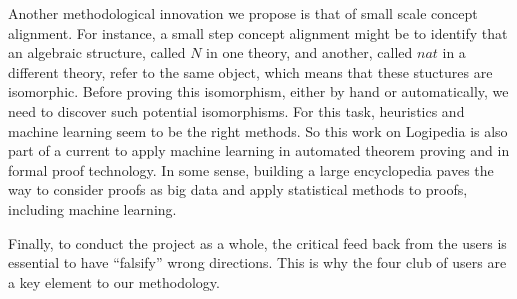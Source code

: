 Another methodological innovation we propose is that of small scale
concept alignment. For instance, a small step concept alignment might
be to identify that an algebraic structure, called $N$ in one theory,
and another, called $nat$ in a different theory, refer to the same
object, which means that these stuctures are isomorphic. Before
proving this isomorphism, either by hand or automatically, we need to
discover such potential isomorphisms. For this task, heuristics and
machine learning seem to be the right methods. So this work on
Logipedia is also part of a current to apply machine learning in
automated theorem proving and in formal proof technology. In some
sense, building a large encyclopedia paves the way to consider proofs
as big data and apply statistical methods to proofs, including machine
learning.

Finally, to conduct the project as a whole, the critical feed back
from the users is essential to have ``falsify'' wrong directions. This
is why the four club of users are a key element to our methodology.

